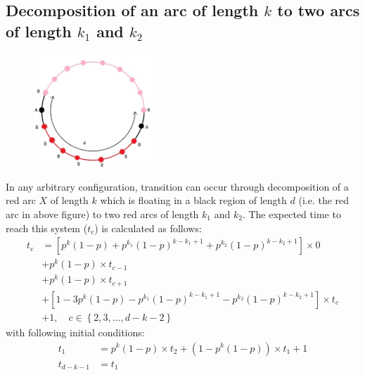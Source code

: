 \documentclass[]{book}
\theoremstyle{definition}
\begin{document}
\subsection{Decomposition of an arc of length $k$ to two arcs of length $k_1$ and $k_2$}
\begin{figure}[H]
    \centering\includegraphics[width=0.4\textwidth]{figures/arc decomposition.jpg}
    \caption{}
\end{figure}
In any arbitrary configuration, transition can occur through decomposition of a red arc $X$ of length $k$ which is floating in a black region of length $d$ (i.e. the red arc in above figure) to two red arcs of length $k_1$ and $k_2$. The expected time to reach this system ($t_c$) is calculated as follows:
\begin{equation}
\begin{split}
    t_c &= \left[ p^k\left( 1-p \right) + p^{k_1}\left(1-p\right)^{k-k_1+1} + p^{k_2}\left(1-p\right)^{k-k_2+1} \right] \times 0 \\
    &+ p^k\left( 1-p \right) \times t_{c-1} \\
    &+ p^k\left( 1-p \right) \times t_{c+1} \\
    &+ \left[1 - 3p^k\left( 1-p \right) - p^{k_1}\left(1-p\right)^{k-k_1+1} - p^{k_2}\left(1-p\right)^{k-k_2+1} \right] \times t_c \\
    &+ 1, \quad c \in \left\{2, 3, \hdots, d-k-2 \right\}
\end{split}
\end{equation}
with following initial conditions:
\begin{equation}
\begin{split}
    t_1 &= p^k\left( 1-p \right) \times t_2 + \left( 1-p^k\left( 1-p \right) \right) \times t_1 + 1 \\
    t_{d-k-1} &= t_1
\end{split}
\end{equation}
\end{document}
